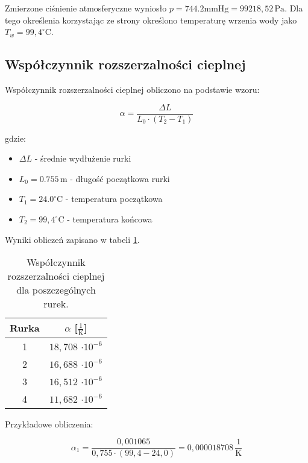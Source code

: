 \documentclass[a4paper,12pt]{article}
\begin{document}
Zmierzone ciśnienie atmosferyczne wyniosło $p = 744.2 \text{mmHg} = 99218{,}52\,\text{Pa}$. Dla tego określenia korzystając ze strony \cite{temperatura_wrzenia} określono temperaturę wrzenia wody jako $T_w = 99{,}4^\circ\text{C}$.


\subsection{Współczynnik rozszerzalności cieplnej}

Współczynnik rozszerzalności cieplnej obliczono na podstawie wzoru:

\begin{equation}
    \label{eq:wspolczynnik_rozszerzalnosci}
    \alpha = \frac{\Delta L}{L_0 \cdot (T_2 - T_1)}
\end{equation}

gdzie:
\begin{itemize}
    \item $\Delta L$ - średnie wydłużenie rurki
    \item $L_0 = 0.755\,\text{m}$ - długość początkowa rurki
    \item $T_1 = 24.0^\circ\text{C}$ - temperatura początkowa
    \item $T_2 = 99{,}4^\circ\text{C}$ - temperatura końcowa
\end{itemize}

Wyniki obliczeń zapisano w tabeli \ref{tab:wspolczynnik_rozszerzalnosci}.

\begin{table}[H]
    \centering
    \begin{tabular}{|c|c|}
        \hline
        Rurka & $\alpha$ [$\frac{1}{\text{K}}$] \\
        \hline
        1 & $18{,}708$ $\cdot 10^{-6}$ \\
        \hline
        2 & $16{,}688$ $\cdot 10^{-6}$ \\
        \hline
        3 & $16{,}512$ $\cdot 10^{-6}$ \\
        \hline
        4 & $11{,}682$ $\cdot 10^{-6}$ \\
        \hline
    \end{tabular}
    \caption{Współczynnik rozszerzalności cieplnej dla poszczególnych rurek.}
    \label{tab:wspolczynnik_rozszerzalnosci}
\end{table}

Przykładowe obliczenia:

\begin{equation}
    \alpha_1 = \frac{0{,}001065}{0{,}755 \cdot (99{,}4 - 24{,}0)} = 0{,}000018708\,\frac{1}{\text{K}}
\end{equation}
\end{document}

